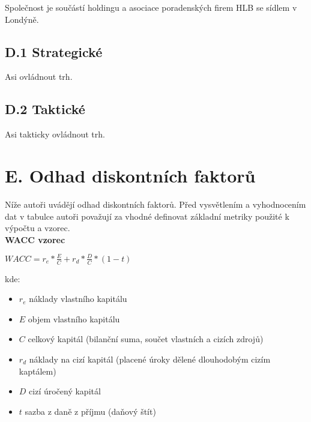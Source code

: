 Společnost je součástí holdingu a asociace poradenských firem HLB se sídlem v Londýně.

\subsection*{D.1 Strategické}
\label{sec:Strategicke}

Asi ovládnout trh.

\subsection*{D.2 Taktické}
\label{sec:Takticke}

Asi takticky ovládnout trh.

\newpage

\section*{E. Odhad diskontních faktorů}
\label{sec:Odhad diskontnich faktoru}

Níže autoři uvádějí odhad diskontních faktorů. Před vysvětlením a vyhodnocením dat v tabulce autoři považují za vhodné definovat základní metriky použité k výpočtu a vzorec.\\

\noindent\textbf{WACC vzorec}\\

\begin{center}
$WACC = r_e * \frac{E}{C} + r_d * \frac{D}{C} * (1 - t)$\\
\end{center}

kde:\\

\begin{itemize}
	\item $r_e$ náklady vlastního kapitálu
	\item $E$ objem vlastního kapitálu
	\item $C$ celkový kapitál (bilanční suma, součet vlastních a cizích zdrojů)
	\item $r_d$ náklady na cizí kapitál (placené úroky dělené dlouhodobým cizím kaptálem)
	\item $D$ cizí úročený kapitál
	\item $t$ sazba z daně z příjmu (daňový štít)
\end{itemize}

